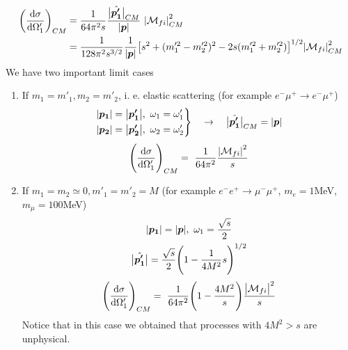 \documentclass[TheoreticalPhy_ModB.tex]{subfiles}
\begin{document}
\begin{example}[$2 \to 2$ scattering]
\[\begin{split}
\biggl( \frac{\de \sigma}{\de \Omega'_1} \biggr)_{CM} 	
	& = \frac{1}{64 \pi^2 s} \frac{\big\vert{\hat{\vec{p'_1}}}\big\vert_{CM}}{\abs{\vec{p}}} \ \abs{\mathM_{fi}}^2_{CM} \\
	& = \frac{1}{128 \pi^2 s^{3/2}} \frac{1}{\abs{\vec{p}}}
		\bigl[s^2 + (m_1^{\prime 2} - m_2^{\prime 2})^2 - 2s(m_1^{\prime 2} + m_2^{\prime 2}) \bigr]^{1/2}
		\abs{\mathM_{fi}}^2_{CM}
\end{split}
\]
We have two important limit cases
\begin{enumerate}[label=(\Alph*)]
\item If $m_1 = m'_1, m_2 = m'_2$, i. e. elastic scattering (for example $e^- \mu^{+} \to e^-\mu^{+}$)
	\begin{equation*}
	\left. \begin{aligned}
	\abs{\boldsymbol{p_1}} = \abs{\boldsymbol{p'_1}},\ \omega_1 = \omega'_1 \\
	\abs{\boldsymbol{p_2}} = \abs{\boldsymbol{p'_2}},\ \omega_2 = \omega'_2
	\end{aligned}
	\right \}\quad\rightarrow
	\quad \big\vert{\hat{\boldsymbol{p'_1}}}\big\vert_{CM} = \abs{\boldsymbol{p}}
	\end{equation*}
	\[
	\Biggl( \frac{\textup{d} \sigma}{\textup{d} \Omega'_1} \Biggr)_{CM} = \ \frac{1}{64 \pi^2} \frac{\abs{\mathcal{M}_{fi}}^2}{s}
	\]
\item If $m_1 = m_2 \simeq 0, m'_1 = m'_2 = M$ (for example $e^-e^+ \to \mu^- \mu^+$, $m_e=1$MeV, $m_\mu=100$MeV)
	\begin{gather}
	\abs{\boldsymbol{p_1}} = \abs{\boldsymbol{p}},\ \omega_1 = \frac{\sqrt{s}}{2} \notag \\
	\big\vert{\hat{\boldsymbol{p'_1}}}\big\vert = \frac{\sqrt{s}}{2} \Biggl( 1 - \frac{1}{4M^2}{s} \Biggr)^{1/2} 
	\end{gather}
	\[
	\Biggl( \frac{\textup{d} \sigma}{\textup{d} \Omega'_1} \Biggr)_{CM} = \ \frac{1}{64 \pi^2} 
	\Biggl( 1 - \frac{4M^2}{s} \Biggr)
	\frac{\big\vert{\mathcal{M}_{fi}}\big\vert^2}{s}
	\]
	Notice that in this case we obtained that processes with $4M^2>s$ are unphysical.
\end{enumerate}
\end{example}
\end{document}
